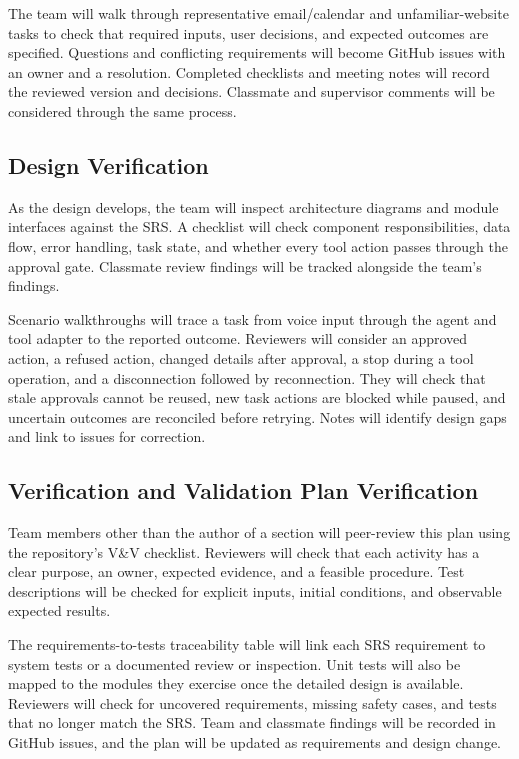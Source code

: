 \documentclass[12pt, titlepage]{article}
\begin{document}
The team will walk through representative email/calendar and unfamiliar-website
tasks to check that required inputs, user decisions, and expected outcomes are
specified. Questions and conflicting requirements will become GitHub issues
with an owner and a resolution. Completed checklists and meeting notes will
record the reviewed version and decisions. Classmate and supervisor comments
will be considered through the same process.

\subsection{Design Verification}

As the design develops, the team will inspect architecture diagrams and module
interfaces against the SRS. A checklist will check component responsibilities,
data flow, error handling, task state, and whether every tool action passes
through the approval gate. Classmate review findings will be tracked alongside
the team's findings.

Scenario walkthroughs will trace a task from voice input through the agent and
tool adapter to the reported outcome. Reviewers will consider an approved
action, a refused action, changed details after approval, a stop during a tool
operation, and a disconnection followed by reconnection. They will check that
stale approvals cannot be reused, new task actions are blocked while paused,
and uncertain outcomes are reconciled before retrying. Notes will identify
design gaps and link to issues for correction.

\subsection{Verification and Validation Plan Verification}

Team members other than the author of a section will peer-review this plan
using the repository's V\&V checklist. Reviewers will check that each activity
has a clear purpose, an owner, expected evidence, and a feasible procedure.
Test descriptions will be checked for explicit inputs, initial conditions, and
observable expected results.

The requirements-to-tests traceability table will link each SRS requirement to
system tests or a documented review or inspection. Unit tests will also be
mapped to the modules they exercise once the detailed design is available.
Reviewers will check for uncovered requirements, missing safety cases, and
tests that no longer match the SRS. Team and classmate findings will be recorded
in GitHub issues, and the plan will be updated as requirements and design change.
\end{document}
